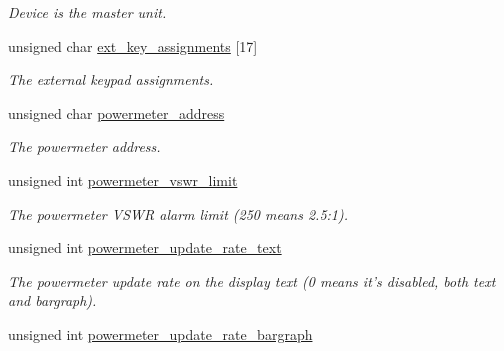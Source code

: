 \begin{CompactItemize}
\begin{CompactList}\small\item\em Device is the master unit. \item\end{CompactList}\item 
\hypertarget{structstruct__setting_0d8abf5fa8187cab0a04c39516a6d48f}{
unsigned char \hyperlink{structstruct__setting_0d8abf5fa8187cab0a04c39516a6d48f}{ext\_\-key\_\-assignments} \mbox{[}17\mbox{]}}
\label{structstruct__setting_0d8abf5fa8187cab0a04c39516a6d48f}

\begin{CompactList}\small\item\em The external keypad assignments. \item\end{CompactList}\item 
\hypertarget{structstruct__setting_25c5a4041939476d6afca80a49f3f551}{
unsigned char \hyperlink{structstruct__setting_25c5a4041939476d6afca80a49f3f551}{powermeter\_\-address}}
\label{structstruct__setting_25c5a4041939476d6afca80a49f3f551}

\begin{CompactList}\small\item\em The powermeter address. \item\end{CompactList}\item 
\hypertarget{structstruct__setting_c82810bd7bc34dd2187f3a9404137156}{
unsigned int \hyperlink{structstruct__setting_c82810bd7bc34dd2187f3a9404137156}{powermeter\_\-vswr\_\-limit}}
\label{structstruct__setting_c82810bd7bc34dd2187f3a9404137156}

\begin{CompactList}\small\item\em The powermeter VSWR alarm limit (250 means 2.5:1). \item\end{CompactList}\item 
\hypertarget{structstruct__setting_4470fe3fcd31195f366c34558bb8a921}{
unsigned int \hyperlink{structstruct__setting_4470fe3fcd31195f366c34558bb8a921}{powermeter\_\-update\_\-rate\_\-text}}
\label{structstruct__setting_4470fe3fcd31195f366c34558bb8a921}

\begin{CompactList}\small\item\em The powermeter update rate on the display text (0 means it's disabled, both text and bargraph). \item\end{CompactList}\item 
\hypertarget{structstruct__setting_7db5aa15f591135cd1f1deb3421db05e}{
unsigned int \hyperlink{structstruct__setting_7db5aa15f591135cd1f1deb3421db05e}{powermeter\_\-update\_\-rate\_\-bargraph}}
\label{structstruct__setting_7db5aa15f591135cd1f1deb3421db05e}


\end{CompactItemize}
